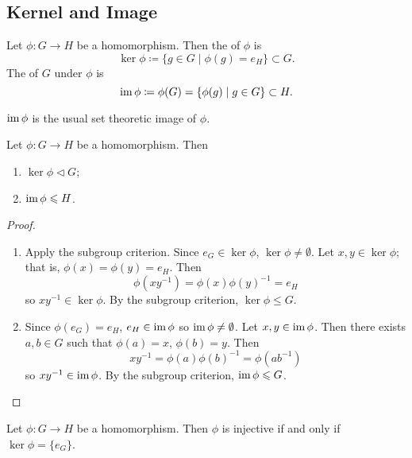 \subsection{Kernel and Image}
\begin{definition}
Let $\phi:G\to H$ be a homomorphism. Then the  of $\phi$ is
\[\ker\phi\coloneqq\{g\in G\mid \phi(g)=e_H\}\subset G.\]
The  of $G$ under $\phi$ is
\[\operatorname{im}\phi\coloneqq\phi(G)=\{\phi(g)\mid g\in G\}\subset H.\]
\end{definition}

\begin{remark}
$\operatorname{im}\phi$ is the usual set theoretic image of $\phi$.
\end{remark}

\begin{proposition}
Let $\phi:G\to H$ be a homomorphism. Then
\begin{enumerate}[label=(\roman*)]
\item $\ker\phi\triangleleft G$;
\item $\operatorname{im}\phi\leqslant H$.
\end{enumerate}
\end{proposition}

\begin{proof} \
\begin{enumerate}[label=(\roman*)]
\item Apply the subgroup criterion. Since $e_G\in\ker\phi$, $\ker\phi\neq\emptyset$. Let $x,y\in\ker\phi$; that is, $\phi(x)=\phi(y)=e_H$. Then
\[\phi(xy^{-1})=\phi(x)\phi(y)^{-1}=e_H\]
so $xy^{-1}\in\ker\phi$. By the subgroup criterion, $\ker\phi\le G$.



\item Since $\phi(e_G)=e_H$, $e_H\in\operatorname{im}\phi$ so $\operatorname{im}\phi\neq\emptyset$. Let $x,y\in\operatorname{im}\phi$. Then there exists $a,b\in G$ such that $\phi(a)=x$, $\phi(b)=y$. Then
\[xy^{-1}=\phi(a)\phi(b)^{-1}=\phi(ab^{-1})\]
so $xy^{-1}\in\operatorname{im}\phi$. By the subgroup criterion, $\operatorname{im}\phi\leqslant G$.
\end{enumerate}
\end{proof}

\begin{proposition}
Let $\phi:G\to H$ be a homomorphism. Then $\phi$ is injective if and only if $\ker\phi=\{e_G\}$.
\end{proposition}

